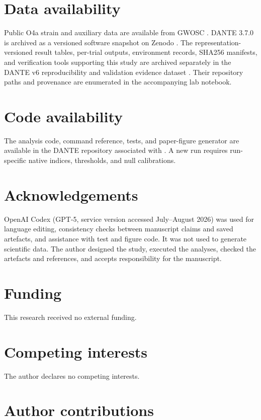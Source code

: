 \documentclass[12pt]{article}
\begin{document}
\section*{Data availability}

Public O4a strain and auxiliary data are available from GWOSC
\cite{gwosc_aux_o4,gwosc_o4a_release}.  DANTE 3.7.0 is archived as a versioned
software snapshot on Zenodo \cite{dante_zenodo}.  The representation-versioned
result tables, per-trial outputs, environment records, SHA256 manifests, and
verification tools supporting this study are archived separately in the DANTE
v6 reproducibility and validation evidence dataset
\cite{dante_v6_evidence}.  Their repository paths and provenance are enumerated
in the accompanying lab notebook.

\section*{Code availability}

The analysis code, command reference, tests, and paper-figure generator are
available in the DANTE repository associated with \cite{dante_zenodo}.  A new
run requires run-specific native indices, thresholds, and null calibrations.

\section*{Acknowledgements}

OpenAI Codex (GPT-5, service version accessed July--August 2026) was used for
language editing, consistency checks
between manuscript claims and saved artefacts, and assistance with test and
figure code.  It was not used to generate scientific data.  The author
designed the study, executed the analyses, checked the artefacts and
references, and accepts responsibility for the manuscript.

\section*{Funding}

This research received no external funding.

\section*{Competing interests}

The author declares no competing interests.

\section*{Author contributions}
\end{document}
